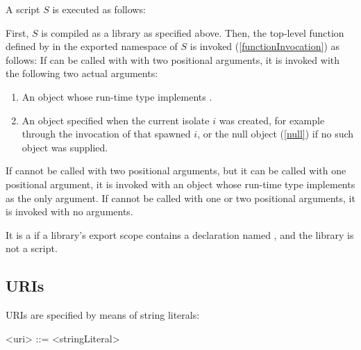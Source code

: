 \documentclass[makeidx]{article}
\begin{document}
{A script $S$ is executed as follows:

\LMHash{}%
First, $S$ is compiled as a library as specified above.
Then, the top-level function defined by 
in the exported namespace of $S$ is invoked (\ref{functionInvocation})
as follows:
If  can be called with with two positional arguments,
it is invoked with the following two actual arguments:
\begin{enumerate}
\item An object whose run-time type implements .
\item An object specified when the current isolate $i$ was created,
for example through the invocation of  that spawned $i$,
or the null object (\ref{null}) if no such object was supplied.
\end{enumerate}
If  cannot be called with two positional arguments,
but it can be called with one positional argument,
it is invoked with an object whose run-time type implements 
as the only argument.
If  cannot be called with one or two positional arguments,
it is invoked with no arguments.



\LMHash{}%
It is a
 if a library's export scope contains a declaration
named , and the library is not a script.


\subsection{URIs}

\LMHash{}%
URIs are specified by means of string literals:

\begin{grammar}
<uri> ::= <stringLiteral>


\end{grammar}}
\end{document}
